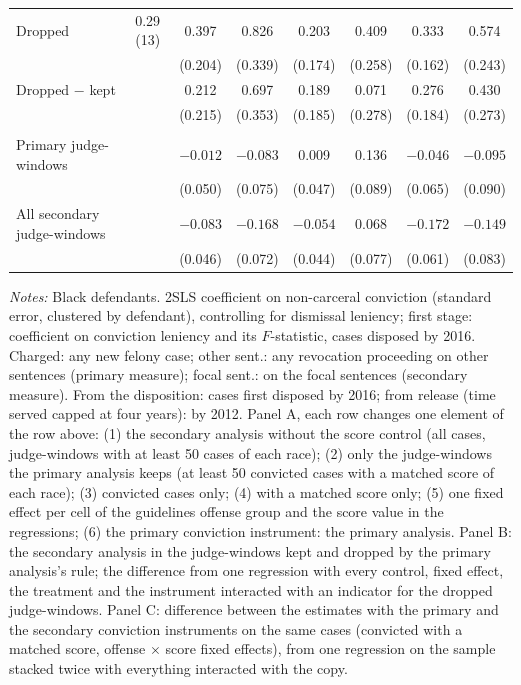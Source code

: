 \documentclass[11pt]{article}
\newcommand{\tabnote}[1]{\par\vspace{0.6ex}\begin{minipage}{\linewidth}\linespread{1}\footnotesize\textit{Notes:} #1\end{minipage}}
\begin{document}
\begin{table}[H]
{{\begin{tabular}{lccccccc}
Dropped & 0.29 (13) & 0.397 & 0.826 & 0.203 & 0.409 & 0.333 & 0.574 \\
 & & (0.204) & (0.339) & (0.174) & (0.258) & (0.162) & (0.243) \\
Dropped $-$ kept & & 0.212 & 0.697 & 0.189 & 0.071 & 0.276 & 0.430 \\
 & & (0.215) & (0.353) & (0.185) & (0.278) & (0.184) & (0.273) \\
\addlinespace
\multicolumn{8}{l}{\textit{C. Primary $-$ secondary instrument on the same cases (convicted, matched score)}} \\
Primary judge-windows & & $-0.012$ & $-0.083$ & 0.009 & 0.136 & $-0.046$ & $-0.095$ \\
 & & (0.050) & (0.075) & (0.047) & (0.089) & (0.065) & (0.090) \\
All secondary judge-windows & & $-0.083$ & $-0.168$ & $-0.054$ & 0.068 & $-0.172$ & $-0.149$ \\
 & & (0.046) & (0.072) & (0.044) & (0.077) & (0.061) & (0.083) \\
\bottomrule
\end{tabular}}}
\tabnote{Black defendants. 2SLS coefficient on non-carceral conviction (standard error, clustered by defendant), controlling for dismissal leniency; first stage: coefficient on conviction leniency and its $F$-statistic, cases disposed by 2016. Charged: any new felony case; other sent.: any revocation proceeding on other sentences (primary measure); focal sent.: on the focal sentences (secondary measure). From the disposition: cases first disposed by 2016; from release (time served capped at four years): by 2012. Panel A, each row changes one element of the row above: (1) the secondary analysis without the score control (all cases, judge-windows with at least 50 cases of each race); (2) only the judge-windows the primary analysis keeps (at least 50 convicted cases with a matched score of each race); (3) convicted cases only; (4) with a matched score only; (5) one fixed effect per cell of the guidelines offense group and the score value in the regressions; (6) the primary conviction instrument: the primary analysis. Panel B: the secondary analysis in the judge-windows kept and dropped by the primary analysis's rule; the difference from one regression with every control, fixed effect, the treatment and the instrument interacted with an indicator for the dropped judge-windows. Panel C: difference between the estimates with the primary and the secondary conviction instruments on the same cases (convicted with a matched score, offense $\times$ score fixed effects), from one regression on the sample stacked twice with everything interacted with the copy.}
\end{table}
\end{document}
